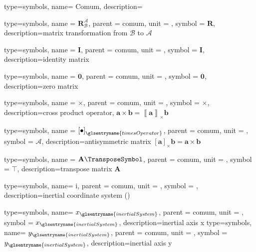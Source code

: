 {type=symbols,
  name= {Comum},
  description={}
}

{type=symbols,
  name = {\ensuremath{{\mathbf{R}}_{\mathcal{B}}^{\mathcal{A}}}},
  parent = {comum},
  unit = \unexpanded{},
  symbol = \ensuremath{\mathbf{R}},
  description={matrix transformation from $\mathcal{B}$ to $\mathcal{A}$}
}

{type=symbols,
  name = {\ensuremath{\mathbf{I}}},
  parent = {comum},
  unit = \unexpanded{},
  symbol = \ensuremath{\mathbf{I}},
  description={identity matrix}
}

{type=symbols,
  name = {\ensuremath{\mathbf{0}}},
  parent = {comum},
  unit = \unexpanded{},
  symbol = \ensuremath{\mathbf{0}},
  description={zero matrix}
}

{type=symbols,
  name = \ensuremath{\times},
  parent = {comum},
  unit = \unexpanded{},
  symbol = \ensuremath{\times},
  description={cross product operator, $\boldsymbol{a}\times\boldsymbol{b}=\left\llbracket \boldsymbol{a}\right\rrbracket_{\times} \boldsymbol{b}$}
}

{type=symbols,
  name = \ensuremath{{\left[\bullet\right]}_\glsentryname{timesOperator}},
  parent = {comum},
  unit = \unexpanded{},
  symbol = \ensuremath{\mathcal{A}},
  description={antisymmetric matrix $\left[\boldsymbol{a}\right]_{\times}\boldsymbol{b}=\boldsymbol{a}\times\boldsymbol{b}$}
}

{type=symbols,
  name = \ensuremath{\mathbf{A}\TransposeSymbol},
  parent = {comum},
  unit = \unexpanded{},
  symbol = \ensuremath{\intercal},
  description={transpose matrix $\mathbf{A}$}
}


{type=symbols,
  name= \ensuremath{\mathrm{i}},
  parent = {comum},
  unit = \unexpanded{},
  symbol = ,
  description={inertial coordinate system ()}
}

{type=symbols,
  name= \ensuremath{x_{\glsentryname{inertialSystem}}},
  parent = {comum},
  unit = \unexpanded{},
  symbol = \ensuremath{x_{\glsentryname{inertialSystem}}},
  description={inertial axis x}
}
{type=symbols,
  name= \ensuremath{y_{\glsentryname{inertialSystem}}},
  parent = {comum},
  unit = \unexpanded{},
  symbol = \ensuremath{y_{\glsentryname{inertialSystem}}},
  description={inertial axis y}
}

